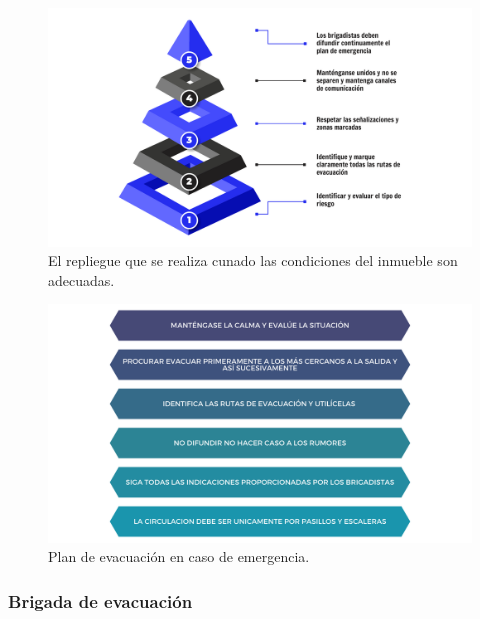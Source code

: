    
    \begin{figure}[H]
        \centering
        \includegraphics[trim = {60mm 10mm 60mm 10mm},clip,scale=0.25]{22/Img/repliegue.pdf}
        \caption{El repliegue que se realiza cunado las condiciones del inmueble son adecuadas.}
        \label{fig:planDeRepliege}
    \end{figure}
    
    
    
    \begin{figure}[H]
        \centering
        \includegraphics[trim = {60mm 10mm 60mm 10mm},clip,scale=0.23]{22/Img/evacuacion.pdf}
        \caption{Plan de evacuación en caso de emergencia.}
        \label{fig:planDeEvacuacion}
    \end{figure}
    
    \subsubsection{Brigada de evacuación}
    
    
